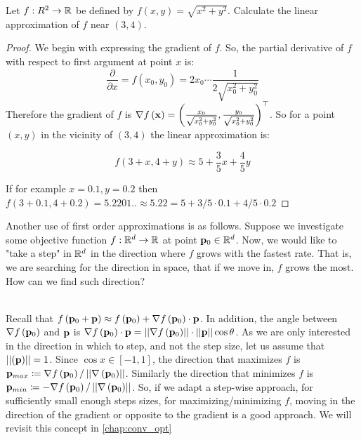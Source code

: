 \begin{exercise}
Let $f:R^2\rightarrow\mathbb{R}$ be defined by $f\left(x,y\right)= \sqrt{x^2+y^2}$. Calculate the linear approximation of $f$ near $\left(3,4\right)$.
\end{exercise}
\begin{proof}
We begin with expressing the gradient of $f$. So, the partial derivative of $f$ with respect to first argument at point $x$ is:
$$ \frac{\partial}{\partial x} = f\left(x_0,y_0\right) = 2x_0 \cdots \frac{1}{2\sqrt{x_0^2+y_0^2}} $$
Therefore the gradient of $f$ is $\nabla f\left(\mathbf{x}\right) = \left(\frac{x_0}{\sqrt{x_0^2+y_0^2}},\frac{y_0}{\sqrt{x_0^2+y_0^2}}\right)^\top$.
So for a point $\left(x,y\right)$ in the vicinity of $\left(3,4\right)$ the linear approximation is:

$$ f\left(3+x, 4+y\right) \approx 5+\frac{3}{5}x+\frac{4}{5}y$$ 

If for example $x=0.1, y=0.2$ then $f\left(3+0.1,4+0.2\right) = 5.2201.. \approx 5.22 = 5+3/5 \cdot 0.1+4/5 \cdot 0.2$
\end{proof}


Another use of first order approximations is as follows. Suppose we investigate some objective function $f:\mathbb{R}^d\rightarrow\mathbb{R}$ at point $\mathbf{p}_0\in\mathbb{R}^d$. Now, we would like to "take a step" in $\mathbb{R}^d$ in the direction where $f$ grows with the fastest rate. That is, we are searching for the direction in space, that if we move in, $f$ grows the most. How can we find such direction?

~\\Recall that $f\left(\mathbf{p}_0+\mathbf{p}\right)\approx f\left(\mathbf{p}_0\right)+\nabla f\left(\mathbf{p}_0\right)\cdot \mathbf{p}$. In addition, the angle between $\nabla f\left(\mathbf{p}_0\right)$ and $\mathbf{p}$ is $\nabla f\left(\mathbf{p}_0\right)\cdot \mathbf{p}=\left|\left| \nabla f\left(\mathbf{p}_0\right)\right|\right|\cdot\left|\left| \mathbf{p}\right|\right| \cos\theta$. As we are only interested in the direction in which to step, and not the step size, let us assume that $\left|\left| \left(\mathbf{p}\right)\right|\right|=1$. Since $\cos x \in \left[-1, 1\right]$, the direction that maximizes $f$ is $\mathbf{p}_{max}\coloneqq \nabla f\left(\mathbf{p}_0\right)/\left|\left| \nabla \left(\mathbf{p}_0\right)\right|\right|$. Similarly the direction that minimizes $f$ is $\mathbf{p}_{min}\coloneqq -\nabla f\left(\mathbf{p}_0\right)/\left|\left| \nabla \left(\mathbf{p}_0\right)\right|\right|$. So, if we adapt a step-wise approach, for sufficiently small enough steps sizes, for maximizing/minimizing $f$, moving in the direction of the gradient or opposite to the gradient is a good approach. We will revisit this concept in \autoref{chap:conv_opt}